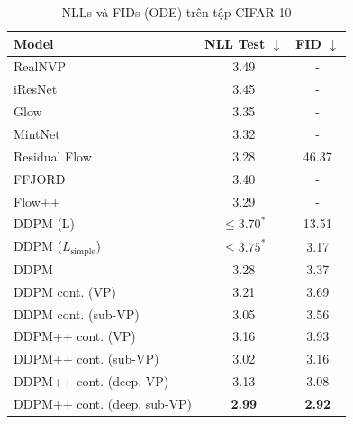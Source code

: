 \documentclass{article} %
\begin{document}
\begin{table}[h!]
    \centering
    \caption{NLLs và FIDs (ODE) trên tập CIFAR-10}
    \begin{tabular}{lcc}
        \hline
        Model & NLL Test $\downarrow$ & FID $\downarrow$ \\
        \hline
        RealNVP \citep{dinh2016density} & 3.49 & - \\
        iResNet \citep{behrmann2019invertible} & 3.45 & - \\
        Glow \citep{kingma2018glow} & 3.35 & - \\
        MintNet \citep{song2019mintnet} & 3.32 & - \\
        Residual Flow \citep{chen2019residual} & 3.28 & 46.37 \\
        FFJORD \citep{grathwohl2018ffjord} & 3.40 & - \\
        Flow++ \citep{ho2019flow++} & 3.29 & - \\
        DDPM (L) \cite{ho2020denoising} & $\leq 3.70^{\ast}$  & 13.51 \\
        DDPM ($L_{\mathrm{simple}}$) \citep{ho2020denoising} & $\leq 3.75^{\ast}$ & 3.17 \\
        \hline
        DDPM & 3.28 & 3.37 \\
        DDPM cont. (VP) & 3.21 & 3.69 \\
        DDPM cont. (sub-VP) & 3.05 & 3.56 \\
        DDPM++ cont. (VP) & 3.16 & 3.93 \\
        DDPM++ cont. (sub-VP) & 3.02 & 3.16 \\
        DDPM++ cont. (deep, VP) & 3.13 & 3.08 \\
        DDPM++ cont. (deep, sub-VP) & \textbf{2.99} & \textbf{2.92} \\
        \hline
    \end{tabular}
    \label{tab:2}
\end{table}
\end{document}

